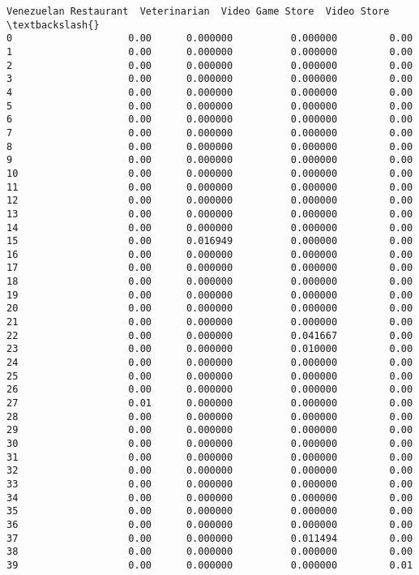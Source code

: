\documentclass[11pt]{article}
\begin{document}
\begin{tcolorbox}[breakable, size=fbox, boxrule=.5pt, pad at break*=1mm, opacityfill=0]
\begin{Verbatim}[commandchars=\\\{\}]
    Venezuelan Restaurant  Veterinarian  Video Game Store  Video Store  \textbackslash{}
0                    0.00      0.000000          0.000000         0.00
1                    0.00      0.000000          0.000000         0.00
2                    0.00      0.000000          0.000000         0.00
3                    0.00      0.000000          0.000000         0.00
4                    0.00      0.000000          0.000000         0.00
5                    0.00      0.000000          0.000000         0.00
6                    0.00      0.000000          0.000000         0.00
7                    0.00      0.000000          0.000000         0.00
8                    0.00      0.000000          0.000000         0.00
9                    0.00      0.000000          0.000000         0.00
10                   0.00      0.000000          0.000000         0.00
11                   0.00      0.000000          0.000000         0.00
12                   0.00      0.000000          0.000000         0.00
13                   0.00      0.000000          0.000000         0.00
14                   0.00      0.000000          0.000000         0.00
15                   0.00      0.016949          0.000000         0.00
16                   0.00      0.000000          0.000000         0.00
17                   0.00      0.000000          0.000000         0.00
18                   0.00      0.000000          0.000000         0.00
19                   0.00      0.000000          0.000000         0.00
20                   0.00      0.000000          0.000000         0.00
21                   0.00      0.000000          0.000000         0.00
22                   0.00      0.000000          0.041667         0.00
23                   0.00      0.000000          0.010000         0.00
24                   0.00      0.000000          0.000000         0.00
25                   0.00      0.000000          0.000000         0.00
26                   0.00      0.000000          0.000000         0.00
27                   0.01      0.000000          0.000000         0.00
28                   0.00      0.000000          0.000000         0.00
29                   0.00      0.000000          0.000000         0.00
30                   0.00      0.000000          0.000000         0.00
31                   0.00      0.000000          0.000000         0.00
32                   0.00      0.000000          0.000000         0.00
33                   0.00      0.000000          0.000000         0.00
34                   0.00      0.000000          0.000000         0.00
35                   0.00      0.000000          0.000000         0.00
36                   0.00      0.000000          0.000000         0.00
37                   0.00      0.000000          0.011494         0.00
38                   0.00      0.000000          0.000000         0.00
39                   0.00      0.000000          0.000000         0.01


\end{Verbatim}
\end{tcolorbox}
\end{document}
